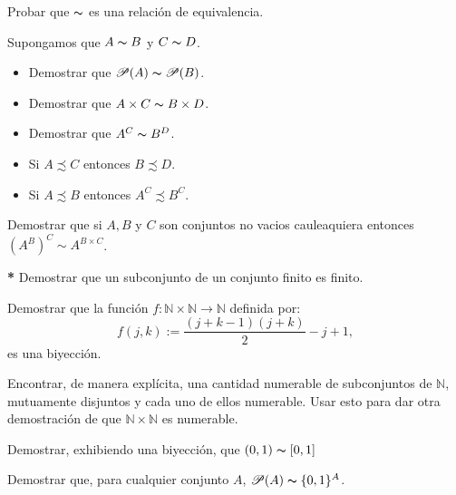 \documentclass{book}
\newcommand{\nn}{\mathbb{N}}
\begin{document}
\begin{ejer}{1} Probar que $\thicksim$ es una
relación de equivalencia.
\end{ejer}

\begin{ejer}{1.2} Supongamos que $A\thicksim B$ y
$C\thicksim D$.
\begin{itemize}
\item[1.] Demostrar que $\mathscr{P}(A)\thicksim \mathscr{P}(B)$.
\item[2.] Demostrar que $A\times C\thicksim B\times D$.
\item[3.] Demostrar que $A^C\thicksim B^D$.
\item[4.] Si $A\precsim C$ entonces $B\precsim D$.
\item[5.] Si $A\precsim B$ entonces $A^C\precsim B^C$.

\end{itemize}
\end{ejer} 

\begin{ejer}{} Demostrar que si $A,B$ y $C$ son conjuntos no vacios cauleaquiera entonces $\left(A^B\right)^C\sim A^{B\times C}$.
\end{ejer}



\begin{ejer}{1.5} \textbf{*} Demostrar que un subconjunto de un conjunto
finito es finito.
\end{ejer}

\begin{ejer}{2} Demostrar que la función
$f:\nn\times\nn\longrightarrow\nn$ definida por:
\[f(j,k):=\frac{(j+k-1)(j+k)}{2}-j+1,\]
es una biyección.
\end{ejer}

\begin{ejer}{} Encontrar, de manera explícita, una cantidad numerable de subconjuntos
de $\nn$, mutuamente disjuntos y cada uno de ellos 
numerable. Usar esto para dar otra demostración de que $\nn\times\nn$ es
numerable.
\end{ejer}

\begin{ejer}{5} Demostrar, exhibiendo una biyección, que $(0,1)\thicksim [0,1]$
\end{ejer}



\begin{ejer}{8} Demostrar que, para cualquier conjunto
$A$, $\mathscr{P}(A)\thicksim\{0,1\}^A$.
\end{ejer}
\end{document}
